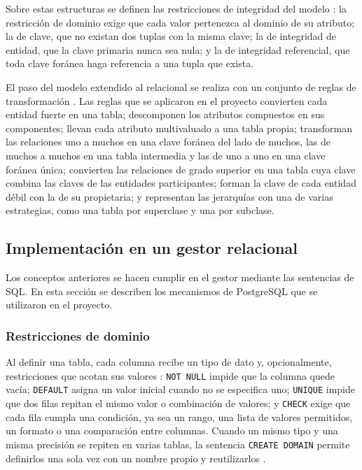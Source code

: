 Sobre estas estructuras se definen las restricciones de integridad del modelo \parencite{elmasri_navathe}: la restricción de dominio exige que cada valor pertenezca al dominio de su atributo; la de clave, que no existan dos tuplas con la misma clave; la de integridad de entidad, que la clave primaria nunca sea nula; y la de integridad referencial, que toda clave foránea haga referencia a una tupla que exista.

El paso del modelo extendido al relacional se realiza con un conjunto de reglas de transformación \parencite[p.~289]{elmasri_navathe}. Las reglas que se aplicaron en el proyecto convierten cada entidad fuerte en una tabla; descomponen los atributos compuestos en sus componentes; llevan cada atributo multivaluado a una tabla propia; transforman las relaciones uno a muchos en una clave foránea del lado de muchos, las de muchos a muchos en una tabla intermedia y las de uno a uno en una clave foránea única; convierten las relaciones de grado superior en una tabla cuya clave combina las claves de las entidades participantes; forman la clave de cada entidad débil con la de su propietaria; y representan las jerarquías con una de varias estrategias, como una tabla por superclase y una por subclase.

\subsection{Implementación en un gestor relacional}

Los conceptos anteriores se hacen cumplir en el gestor mediante las sentencias de SQL. En esta sección se describen los mecanismos de PostgreSQL que se utilizaron en el proyecto.

\subsubsection{Restricciones de dominio}

Al definir una tabla, cada columna recibe un tipo de dato y, opcionalmente, restricciones que acotan sus valores \parencite{postgres_constraints}: \texttt{NOT NULL} impide que la columna quede vacía; \texttt{DEFAULT} asigna un valor inicial cuando no se especifica uno; \texttt{UNIQUE} impide que dos filas repitan el mismo valor o combinación de valores; y \texttt{CHECK} exige que cada fila cumpla una condición, ya sea un rango, una lista de valores permitidos, un formato o una comparación entre columnas. Cuando un mismo tipo y una misma precisión se repiten en varias tablas, la sentencia \texttt{CREATE DOMAIN} permite definirlos una sola vez con un nombre propio y reutilizarlos \parencite{postgres_createdomain}.

